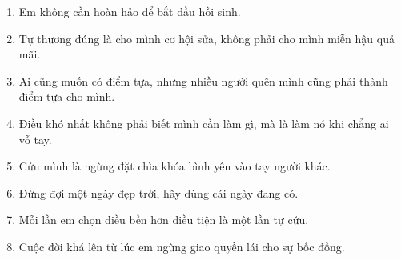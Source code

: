 \begin{enumerate}[leftmargin=*]
\item Em không cần hoàn hảo để bắt đầu hồi sinh.
\item Tự thương đúng là cho mình cơ hội sửa, không phải cho mình miễn hậu quả mãi.
\item Ai cũng muốn có điểm tựa, nhưng nhiều người quên mình cũng phải thành điểm tựa cho mình.
\item Điều khó nhất không phải biết mình cần làm gì, mà là làm nó khi chẳng ai vỗ tay.
\item Cứu mình là ngừng đặt chìa khóa bình yên vào tay người khác.
\item Đừng đợi một ngày đẹp trời, hãy dùng cái ngày đang có.
\item Mỗi lần em chọn điều bền hơn điều tiện là một lần tự cứu.
\item Cuộc đời khá lên từ lúc em ngừng giao quyền lái cho sự bốc đồng.
\end{enumerate}

